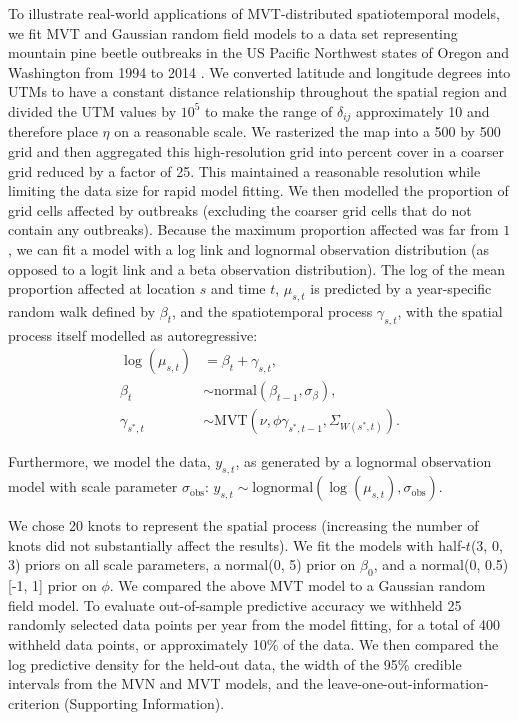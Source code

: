 \documentclass[12pt,english]{article}
\begin{document}
\begin{spacing}{1.9}
To illustrate real-world applications of MVT-distributed
spatiotemporal models,
we fit MVT and Gaussian random field models
to a data set representing
mountain pine beetle outbreaks in the
US Pacific Northwest states of Oregon and Washington
from 1994 to 2014 \citep{usdaforestservice2017}.
We converted latitude and longitude degrees into UTMs to have a constant
distance relationship throughout the spatial region and divided the UTM values
by $10^5$ to make the range of $\delta_{ij}$ approximately 10 and therefore
place $\eta$ on a reasonable scale.
We rasterized the map into a 500 by 500 grid
and then aggregated this high-resolution grid
into percent cover in a coarser grid reduced by a factor of 25.
This maintained a reasonable resolution
while limiting the data size for rapid model fitting.
We then modelled the
proportion of grid cells affected by outbreaks
(excluding the coarser grid cells that do not contain any outbreaks).
Because the maximum proportion affected was far from $1$, we
can fit a model with a log link and lognormal observation distribution
(as opposed to a logit link and a beta observation distribution).
The log of the mean proportion affected at location $s$ and time $t$, $\mu_{s,t}$
is predicted by a year-specific random walk defined by $\beta_t$,
and the spatiotemporal process $\gamma_{s,t}$,
with the spatial process itself modelled as autoregressive:
\begin{align}
  \log(\mu_{s,t}) &= \beta_t + \gamma_{s,t},\\ \label{eq:beetle-mu}
  \beta_t &\sim \mathrm{normal}\left( \beta_{t-1}, \sigma_{\beta} \right), \\
  \gamma_{s^{*},t} &\sim
    \mathrm{MVT}\left(\nu, \phi \gamma_{s^{*},t-1}, \Sigma_{W(s^{*},t)}\right).
\end{align}

\noindent Furthermore,
we model the data, $y_{s,t}$, as generated by a lognormal observation model
with scale parameter $\sigma_{\mathrm{obs}}$:
$y_{s,t} \sim \mathrm{lognormal} \left(  \log(\mu_{s,t}), \sigma_{\mathrm{obs}} \right)$.

We chose 20 knots to represent the spatial process
(increasing the number of knots did not substantially affect the results).
We fit the models with half-$t$(3, 0, 3) priors on all
scale parameters,
a normal(0, 5) prior on $\beta_0$,
and a normal(0, 0.5)[-1, 1] prior on $\phi$.
We compared the above MVT
model to a Gaussian random field model.
To evaluate out-of-sample predictive accuracy we withheld
25 randomly selected data points
per year from the model fitting,
for a total of 400 withheld data points,
or approximately 10\% of the data.
We then compared the log predictive density for the held-out data,
the width of the 95\% credible intervals
from the MVN and MVT models, and
the leave-one-out-information-criterion (Supporting Information).


\end{spacing}
\end{document}
